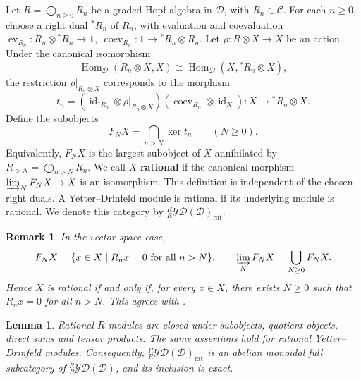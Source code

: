 \documentclass[11pt, a4paper]{article}
\numberwithin{equation}{section}
\newcommand{\C}{\mathcal C}
\newcommand{\D}{\mathcal D}
\newcommand{\YD}{\mathcal{YD}}
\newcommand{\one}{\mathbf 1}
\DeclareMathOperator{\id}{id}
\newcommand{\rat}{\mathrm{rat}}
\newtheorem{lemma}[theorem]{Lemma}
\newtheorem{remark}[theorem]{Remark}
\begin{document}
Let $R=\bigoplus_{n\geq0}R_n$ be a graded Hopf algebra in $\D$, with
$R_n\in\C$. For each $n\geq0$, choose a right dual ${^*R_n}$ of $R_n$,
with evaluation and coevaluation
$
 \operatorname{ev}_{R_n}:R_n\otimes {^*R_n}\to\one,
 \
 \operatorname{coev}_{R_n}:\one\to {^*R_n}\otimes R_n.
$
Let $\rho:R\otimes X\to X$ be an action.
Under the canonical isomorphism
\[
 \operatorname{Hom}_{\D}(R_n\otimes X,X)
 \cong
 \operatorname{Hom}_{\D}(X,{^*R_n}\otimes X),
\]
the restriction $\rho|_{R_n\otimes X}$ corresponds to the morphism
\[
 t_n
 =(\id_{{^*R_n}}\otimes\rho|_{R_n\otimes X})
   (\operatorname{coev}_{R_n}\otimes\id_X):
 X\longrightarrow {^*R_n}\otimes X.
\]
Define the subobjects
\begin{equation}\label{dual:rational-filtration}
 F_NX=\bigcap_{n>N}\ker t_n\qquad(N\geq0).
\end{equation}
Equivalently, $F_NX$ is the largest subobject of $X$ annihilated by
$R_{>N}=\bigoplus_{n>N}R_n$. We call $X$ \textbf{rational} if the
canonical morphism $\varinjlim_N F_NX\to X$ is an isomorphism.
This definition is independent of the chosen right duals. A
Yetter--Drinfeld module is rational if its underlying module is rational.
We denote this category by $_R^R\YD(\D)_{\rat}$.
\begin{remark}\upshape
In the vector-space case,
\[
 F_NX=\{x\in X\mid R_nx=0\text{ for all }n>N\},
 \qquad
 \varinjlim_NF_NX=\bigcup_{N\geq0}F_NX.
\]
Hence $X$ is rational if and only if, for every $x\in X$,
there exists $N\geq0$ such that $R_nx=0$ for all $n>N$.
This agrees with \cite[Definition~12.2.3]{rootsys}.
\end{remark}
\begin{lemma}\label{dual:rational-closure}
Rational $R$-modules are closed under subobjects, quotient objects,
direct sums and tensor products. The same assertions hold for rational
Yetter--Drinfeld modules. Consequently, ${}_R^R\YD(\D)_{\rat}$ is an
abelian monoidal full subcategory of ${}_R^R\YD(\D)$, and its inclusion
is exact.
\end{lemma}
\end{document}
